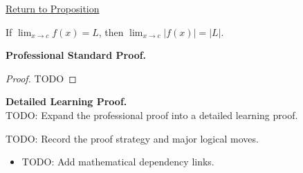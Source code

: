 \newpage
{}
\label{prf:limit-absolute-value}

\begin{remark*}[Return]
\hyperref[prop:limit-absolute-value]{Return to Proposition}
\end{remark*}

\begin{proposition*}
If $\lim_{x\to c}f(x)=L$, then $\lim_{x\to c}|f(x)|=|L|$.
\end{proposition*}

\textbf{Professional Standard Proof.}~\\
\begin{proof}
TODO
\end{proof}

\textbf{Detailed Learning Proof.}~\\
TODO: Expand the professional proof into a detailed learning proof.

\begin{remark*}
TODO: Record the proof strategy and major logical moves.
\end{remark*}

\begin{dependencies}
\begin{itemize}
  \item TODO: Add mathematical dependency links.
\end{itemize}
\end{dependencies}
